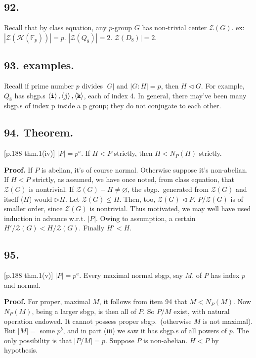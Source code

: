 \documentclass[12pt]{article}
\newcommand{\Ab}[1]{ \left\langle #1 \right\rangle } %
\newcommand{\BF}[1]{ \mathbb{#1} }%
\newcommand{\CF}[1]{ \mathcal{#1} }%
\newcommand{\SF}[1]{ \mathscr{#1} }%
\newcommand{\Ss}[1]{\textsf{\textbf{#1}}}%
\newcommand{\Tw}[1]{\texttt{\textbf{#1}}}%
\begin{document}
\subsection*{92.} Recall that by class equation, any \(p\)-group \(G\) has non-trivial center \(\SF Z(G)\). 
ex: \(|\SF Z(\CF H(\BF F_p))| = p\). \(|\SF Z(Q_8)| =2\). \(\SF Z(D_8)| =2\). 

\subsection*{93. examples.} Recall if prime number \(p\) divides \(|G|\) and \(|G:H| = p\), then \(H \lhd G\). 
For example, \(Q_8\) has sbgp.s \(\Ab{\Tw i}, \Ab{\Tw j}, \Ab{\Tw k}\), each of index 4. 
In general, there may've been many sbgp.s of index p inside a p group; they do not conjugate to each other. 

\subsection*{94. Theorem.} [p.188 thm.1(iv)] \(|P|=p^a\). 
If \(H < P\) strictly, then \(H < N_P(H)\) strictly. \par
\Ss{Proof.} If \(P\) is abelian, it's of course normal. 
Otherwise suppose it's non-abelian. 
If \(H < P\) strictly, as assumed, we have once noted, from class equation, that \(\SF Z(G)\) is nontrivial. 
If \(\SF Z(G) - H \neq \varnothing\), the sbgp.\ generated from \(\SF Z(G)\) and itself (\(H\)) would \(\rhd H\). 
Let \(\SF Z(G) \leq H\). 
Then, too, \(\SF Z(G) \lhd P\). 
\(P/ \SF Z(G)\) is of smaller order, since \(\SF Z(G)\) is nontrivial. 
Thus motivated, we may well have used induction in advance w.r.t. \(|P|\). 
Owing to assumption, a certain \(H'/\SF Z(G) < H/\SF Z(G)\). 
Finally \(H' < H\). 

\subsection*{95.} [p.188 thm.1(v)] \(|P|=p^a\). Every maximal normal sbgp, say \(M\), of \(P\) has index \(p\) and normal. \par
\Ss{Proof.} For proper, maximal \(M\), it follows from item 94 that \(M < N_P(M)\). 
Now \(N_P(M)\), being a larger sbgp, is then all of \(P\). 
So \(P/M\) exist, with natural operation endowed. 
It cannot possess proper sbgp.\ (otherwise \(M\) is not maximal). 
But \(|M|=\) some \(p^b\), and in part (iii) we saw it has sbgp.s of all powers of \(p\). 
The only possibility is that \(|P/M| =p\). 
Suppose \(P\) is non-abelian. 
\(H < P\) by hypothesis. 
\end{document}
